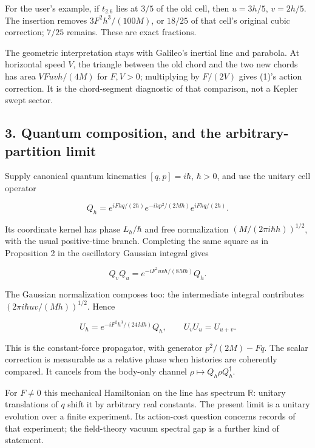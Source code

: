 \documentclass[11pt,a4paper]{article}
\begin{document}
For the user's example, if \(t_{2.6}\) lies at \(3/5\) of the old cell,
then \(u=3h/5\), \(v=2h/5\). The insertion removes \(3F^2h^3/(100M)\),
or \(18/25\) of that cell's original cubic correction; \(7/25\) remains.
These are exact fractions.

The geometric interpretation stays with Galileo's inertial line and
parabola. At horizontal speed \(V\), the triangle between the old chord
and the two new chords has area \(VFuvh/(4M)\) for \(F,V>0\);
multiplying by \(F/(2V)\) gives (1)'s action correction. It is the
chord-segment diagnostic of that comparison, not a Kepler swept sector.

\hypertarget{quantum-composition-and-the-arbitrary-partition-limit}{%
\subsection{3. Quantum composition, and the arbitrary-partition
limit}\label{quantum-composition-and-the-arbitrary-partition-limit}}

Supply canonical quantum kinematics \([q,p]=i\hbar\), \(\hbar>0\), and
use the unitary cell operator

\[Q_h=e^{iFhq/(2\hbar)}e^{-ihp^2/(2M\hbar)}e^{iFhq/(2\hbar)}.\]

Its coordinate kernel has phase \(L_h/\hbar\) and free normalization
\((M/(2\pi i\hbar h))^{1/2}\), with the usual positive-time branch.
Completing the same square as in Proposition 2 in the oscillatory
Gaussian integral gives

\[Q_vQ_u=e^{-iF^2uvh/(8M\hbar)}Q_h.\]

The Gaussian normalization composes too: the intermediate integral
contributes \((2\pi i\hbar uv/(Mh))^{1/2}\). Hence

\[U_h=e^{-iF^2h^3/(24M\hbar)}Q_h,
\qquad U_vU_u=U_{u+v}. \tag{3}\]

This is the constant-force propagator, with generator \(p^2/(2M)-Fq\).
The scalar correction is measurable as a relative phase when histories
are coherently compared. It cancels from the body-only channel
\(\rho\mapsto Q_h\rho Q_h^\dagger\).

For \(F\ne0\) this mechanical Hamiltonian on the line has spectrum
\(\mathbb R\): unitary translations of \(q\) shift it by arbitrary real
constants. The present limit is a unitary evolution over a finite
experiment. Its action-cost question concerns records of that
experiment; the field-theory vacuum spectral gap is a further kind of
statement.
\end{document}
